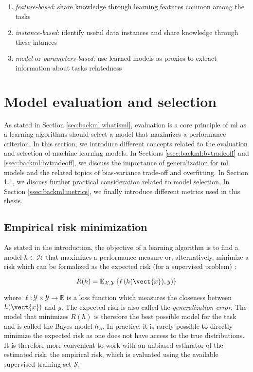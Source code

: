 \begin{enumerate}
  \item \textit{feature-based}: share knowledge through learning features common among the tasks
  \item \textit{instance-based}: identify useful data instances and share knowledge through these intances
  \item \textit{model} or \textit{parameters-based}: use learned models as proxies to extract information about tasks relatedness
\end{enumerate}


\section{Model evaluation and selection}

As stated in Section \ref{sec:backml:whatisml}, evaluation is a core principle of \acrlong{ml} as a learning algorithms should select a model that maximizes a performance criterion. In this section, we introduce different concepts related to the evaluation and selection of machine learning models. In Sections \ref{ssec:backml:bvtradeoff} and \ref{ssec:backml:bvtradeoff}, we discuss the importance of generalization for \acrlong{ml} models and the related topics of bias-variance trade-off and overfitting. In Section \ref{ssec:backml:modelselection}, we discuss further practical consideration related to model selection. In Section \ref{ssec:backml:metrics}, we finally introduce different metrics used in this thesis. 


\subsection{Empirical risk minimization}
\label{ssec:backml:modelselection}
As stated in the introduction, the objective of a learning algorithm is to find a model $h \in \mathcal{H}$ that maximizes a performance measure or, alternatively, minimize a risk which can be formalized as the expected risk (for a supervised problem) \parencite{vapnik1992principles}:

\begin{equation}
\label{eqn:backml:expriskmin}
R(h) = \mathbb{E}_{\mathcal{X},\mathcal{Y}}\left\{\ell\left(h(\vect{x}), y\right)\right\}
\end{equation}

where $\ell: \mathcal{Y}\times\mathcal{Y} \rightarrow \mathbb{R}$ is a loss function which measures the closeness between $h(\vect{x})$ and $y$. The expected risk is also called the \textit{generalization error}. The model that minimizes $R(h)$ is therefore the best possible model for the task and is called the Bayes model $h_B$. In practice, it is rarely possible to directly minimize the expected risk as one does not have access to the true distributions. It is therefore more convenient to work with an unbiased estimator of the estimated risk, the empirical risk, which is evaluated using the available supervised training set $\mathcal{S}$:


